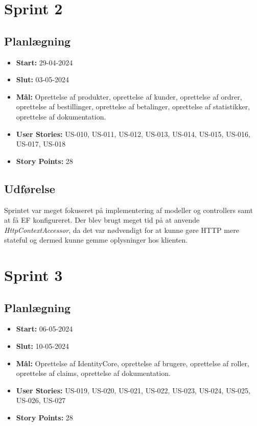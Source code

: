 \section{Sprint 2}
\label{sec:sprint-2}
\subsection{Planlægning}
\label{subsec:sprint-2-plan}
\begin{itemize}
    \item \textbf{Start:} 29-04-2024
    \item \textbf{Slut:} 03-05-2024
    \item \textbf{Mål:} Oprettelse af produkter, oprettelse af kunder, oprettelse af ordrer, oprettelse af bestillinger, oprettelse af betalinger, oprettelse af statistikker, oprettelse af dokumentation.
    \item \textbf{User Stories:} US-010, US-011, US-012, US-013, US-014, US-015, US-016, US-017, US-018
    \item \textbf{Story Points:} 28
\end{itemize}

\subsection{Udførelse}
\label{subsec:sprint-2-udforelse}
Sprintet var meget fokuseret på implementering af modeller og controllers samt at få EF konfigureret. 
Der blev brugt meget tid på at anvende \emph{HttpContextAccessor}, da det var nødvendigt for at kunne gøre HTTP mere stateful og dermed kunne gemme oplysninger hos klienten.

\section{Sprint 3}
\label{sec:sprint-3}
\subsection{Planlægning}
\label{subsec:sprint-3-plan}
\begin{itemize}
    \item \textbf{Start:} 06-05-2024
    \item \textbf{Slut:} 10-05-2024
    \item \textbf{Mål:} Oprettelse af IdentityCore, oprettelse af brugere, oprettelse af roller, oprettelse af claims, oprettelse af dokumentation.
    \item \textbf{User Stories:} US-019, US-020, US-021, US-022, US-023, US-024, US-025, US-026, US-027
    \item \textbf{Story Points:} 28
\end{itemize}


